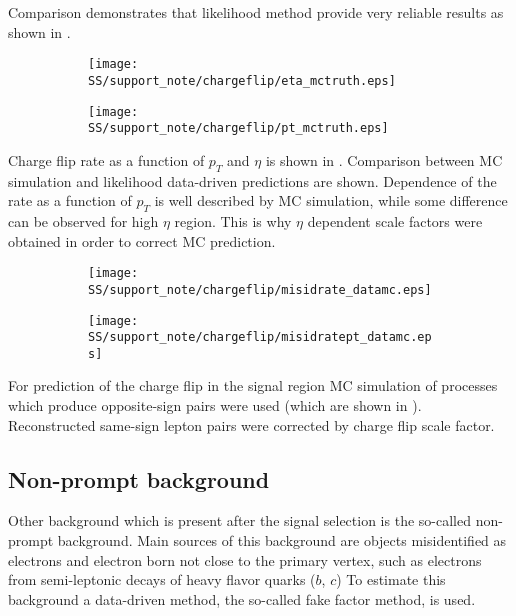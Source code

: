 Comparison demonstrates that likelihood method provide very reliable results as shown in
.

\begin{figure}
\begin{subfigure}{.5\textwidth}
  \centering
  \texttt{[image: SS/support\_note/chargeflip/eta\_mctruth.eps]}
\end{subfigure}%
\begin{subfigure}{.5\textwidth}
  \centering
  \texttt{[image: SS/support\_note/chargeflip/pt\_mctruth.eps]}
\end{subfigure}
\caption{\toDo}
\label{fig:likelihood_cross_check}
\end{figure}

Charge flip rate as a function of $p_T$ and $\eta$ is shown in .
Comparison between MC simulation and likelihood data-driven predictions are shown. 
Dependence of the rate as a function of $p_T$ is well described by MC simulation, while some difference can be observed
for high $\eta$ region. This is why $\eta$ dependent scale factors were obtained in order to correct MC prediction.

\begin{figure}
\begin{subfigure}{.5\textwidth}
  \centering
  \texttt{[image: SS/support\_note/chargeflip/misidrate\_datamc.eps]}
\end{subfigure}%
\begin{subfigure}{.5\textwidth}
  \centering
  \texttt{[image: SS/support\_note/chargeflip/misidratept\_datamc.eps]}
\end{subfigure}
\caption{\toDo}
\label{fig:charge_flip_data_vs_mc}
\end{figure}

For prediction of the charge flip in the signal region MC simulation of processes which produce opposite-sign pairs
were used (which are shown in ). Reconstructed same-sign lepton pairs were corrected by 
charge flip scale factor.

\subsection{Non-prompt background}

Other background which is present after the signal selection is the so-called non-prompt background.
Main sources of this background are objects misidentified as electrons and electron born not close 
to the primary vertex, such as electrons from semi-leptonic decays of heavy flavor quarks ($b$, $c$)
To estimate this background a data-driven method, the so-called fake factor method, is used.

